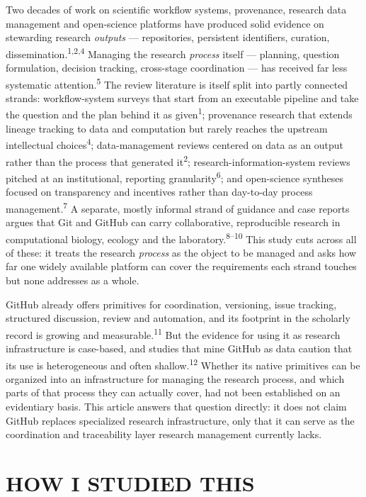 \documentclass{IEEEcsmag}
\begin{document}
Two decades of work on scientific workflow systems, provenance, research data management and open-science platforms have produced solid evidence on stewarding research \emph{outputs} --- repositories, persistent identifiers, curation, dissemination.\textsuperscript{1,2,4} Managing the research \emph{process} itself --- planning, question formulation, decision tracking, cross-stage coordination --- has received far less systematic attention.\textsuperscript{5} The review literature is itself split into partly connected strands: workflow-system surveys that start from an executable pipeline and take the question and the plan behind it as given\textsuperscript{1}; provenance research that extends lineage tracking to data and computation but rarely reaches the upstream intellectual choices\textsuperscript{4}; data-management reviews centered on data as an output rather than the process that generated it\textsuperscript{2}; research-information-system reviews pitched at an institutional, reporting granularity\textsuperscript{6}; and open-science syntheses focused on transparency and incentives rather than day-to-day process management.\textsuperscript{7} A separate, mostly informal strand of guidance and case reports argues that Git and GitHub can carry collaborative, reproducible research in computational biology, ecology and the laboratory.\textsuperscript{8--10} This study cuts across all of these: it treats the research \emph{process} as the object to be managed and asks how far one widely available platform can cover the requirements each strand touches but none addresses as a whole.

GitHub already offers primitives for coordination, versioning, issue tracking, structured discussion, review and automation, and its footprint in the scholarly record is growing and measurable.\textsuperscript{11} But the evidence for using it as research infrastructure is case-based, and studies that mine GitHub as data caution that its use is heterogeneous and often shallow.\textsuperscript{12} Whether its native primitives can be organized into an infrastructure for managing the research process, and which parts of that process they can actually cover, had not been established on an evidentiary basis. This article answers that question directly: it does not claim GitHub replaces specialized research infrastructure, only that it can serve as the coordination and traceability layer research management currently lacks.

\section{HOW I STUDIED THIS}
\end{document}
